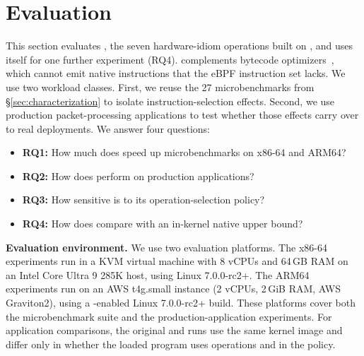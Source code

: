 \section{Evaluation}
\label{sec:eval}

This section evaluates \lang, the seven hardware-idiom operations built on \tool, and uses \tool itself for one further experiment (RQ4).
\lang complements bytecode optimizers~\cite{xu2021synthesizing,mao2024merlin,zhu2025epso}, which cannot emit native instructions that the eBPF instruction set lacks.
We use two workload classes.
First, we reuse the 27 microbenchmarks from \S\ref{sec:characterization} to isolate instruction-selection effects.
Second, we use production packet-processing applications to test whether those effects carry over to real deployments.
We answer four questions:

\begin{itemize}
\item \textbf{RQ1:} How much does \lang speed up microbenchmarks on x86-64 and ARM64?
\item \textbf{RQ2:} How does \lang perform on production applications?
\item \textbf{RQ3:} How sensitive is \lang to its operation-selection policy?
\item \textbf{RQ4:} How does \tool compare with an in-kernel native upper bound?
\end{itemize}

\noindent\textbf{Evaluation environment.}
We use two evaluation platforms.
The x86-64 experiments run in a KVM virtual machine with 8 vCPUs and 64\,GB RAM on an Intel Core Ultra 9 285K host, using Linux 7.0.0-rc2+.
The ARM64 experiments run on an AWS t4g.small instance (2 vCPUs, 2\,GiB RAM, AWS Graviton2), using a \lang-enabled Linux 7.0.0-rc2+ build.
These platforms cover both the microbenchmark suite and the production-application experiments.
For application comparisons, the original and \lang runs use the same kernel image and differ only in whether the loaded program uses \lang operations and in the \lang policy.

